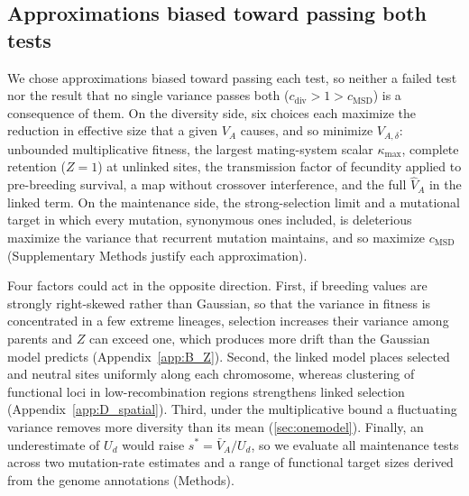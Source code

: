 \documentclass{article}
\begin{document}
\subsection{Approximations biased toward passing both tests}\label{sec:approx}
We chose approximations biased toward passing each test, so neither a failed test nor the result that no single variance passes both ($c_\text{div} > 1 > c_\text{MSD}$) is a consequence of them. On the diversity side, six choices each maximize the reduction in effective size that a given $V_A$ causes, and so minimize $V_{A,\delta}$: unbounded multiplicative fitness, the largest mating-system scalar $\kappa_\text{max}$, complete retention ($Z = 1$) at unlinked sites, the transmission factor of fecundity applied to pre-breeding survival, a map without crossover interference, and the full $\hat{V}_A$ in the linked term. On the maintenance side, the strong-selection limit and a mutational target in which every mutation, synonymous ones included, is deleterious maximize the variance that recurrent mutation maintains, and so maximize $c_\text{MSD}$ (Supplementary Methods justify each approximation).

Four factors could act in the opposite direction. First, if breeding values are strongly right-skewed rather than Gaussian, so that the variance in fitness is concentrated in a few extreme lineages, selection increases their variance among parents and $Z$ can exceed one, which produces more drift than the Gaussian model predicts (Appendix~\ref{app:B_Z}). Second, the linked model places selected and neutral sites uniformly along each chromosome, whereas clustering of functional loci in low-recombination regions strengthens linked selection (Appendix~\ref{app:D_spatial}). Third, under the multiplicative bound a fluctuating variance removes more diversity than its mean (\autoref{sec:onemodel}). Finally, an underestimate of $U_d$ would raise $s^* = \bar{V}_A/U_d$, so we evaluate all maintenance tests across two mutation-rate estimates and a range of functional target sizes derived from the genome annotations (Methods).

\ifdefined\isMainDocument
\else
    \printbibliography
    
\end{document}
